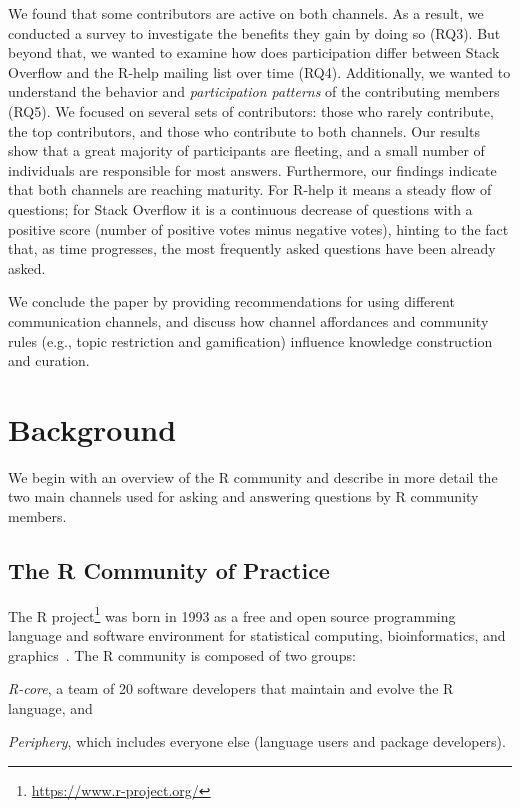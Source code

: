 \documentclass[smallextended]{svjour3}       %
\newcommand{\SO}{Stack Overflow\xspace}
\newcommand{\RH}{R-help\xspace}
\begin{document}
We found that some contributors are active on both channels. As a
result, we conducted a survey to investigate the benefits they gain by
doing so (RQ3). But beyond that, we wanted to examine how does participation differ between \SO and the \RH mailing list over time (RQ4). Additionally, we wanted to understand the behavior and \textit{participation patterns} of the contributing members (RQ5). We focused on several sets of contributors: those who rarely contribute,
the top contributors, and those who contribute to both channels. 
Our results show that a great majority of participants are
fleeting, and a small number of individuals are responsible for most
answers.  Furthermore, our findings indicate that both channels are reaching
maturity. For \RH it means a steady flow of questions; for \SO it is a continuous decrease of questions with a positive score
(number of positive votes minus negative votes), hinting to the fact
that, as time progresses, the most frequently asked questions have
been already asked.

We conclude the paper by providing recommendations for
using different communication channels, and discuss how channel
affordances and community rules (e.g., topic restriction and
gamification) influence knowledge construction and curation.

 \section{Background}
\label{cha:background}
We begin with an overview of the R community and describe in more detail the two main channels used for asking and answering questions by R community members.

\subsection{The R Community of Practice}
    
    The R project\footnote{\url{https://www.r-project.org/}} was born in 1993 as a free and open source programming language and software environment for statistical computing, bioinformatics, and graphics~\cite{Ihaka1996}.
    The R community is composed of two groups:
    \begin{enumerate*}[label=(\arabic*)]
      \item \textit{R-core}, a team of 20 software developers that maintain and evolve the R language, and
      \item \textit{Periphery}, which includes everyone else (language users and package developers).
    \end{enumerate*}
\end{document}
